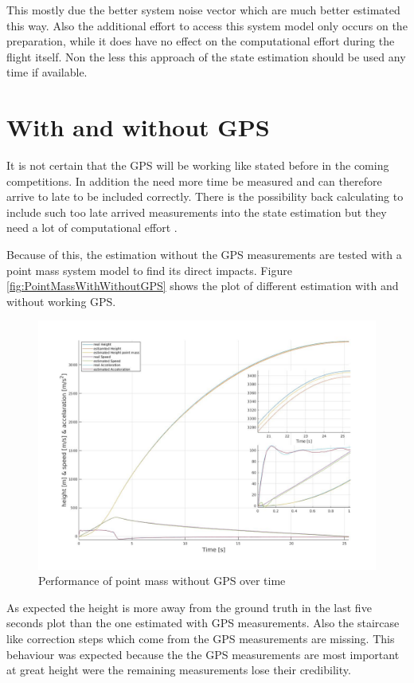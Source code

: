 This mostly due the better system noise vector which are much better estimated this way.
Also the additional effort to access this system model only occurs on the preparation,
while it does have no effect on the computational effort during the flight itself.
Non the less this approach of the state estimation should be used any time if available.

\newpage
\section{With and without GPS}
It is not certain that the GPS will be working like stated before in the coming competitions.
In addition the need more time be measured and can therefore arrive to late to be included correctly.
There is the possibility back calculating to include such too late arrived measurements into the state estimation but they need a lot of computational effort \cite{SimonDan2006Ose:}.

Because of this, the estimation without the GPS measurements are tested with a point mass system model to find its direct impacts.
Figure \ref{fig:PointMassWithWithoutGPS} shows the plot of different estimation with and without working GPS.

\begin{figure}[h!]
 \centering
 \includegraphics[width=.8 \textwidth]{./Pictures/PointMassWihtoutGPSPerformance.jpg}
 \caption{Performance of point mass without GPS over time}
 \label{fig:PointMassWithoutGPSPerformance}
\end{figure}

As expected the height is more away from the ground truth in the last five seconds plot than the one estimated with GPS measurements.
Also the staircase like correction steps which come from the GPS measurements are missing.
This behaviour was expected because the the GPS measurements are most important at great height were the remaining measurements lose their credibility.


